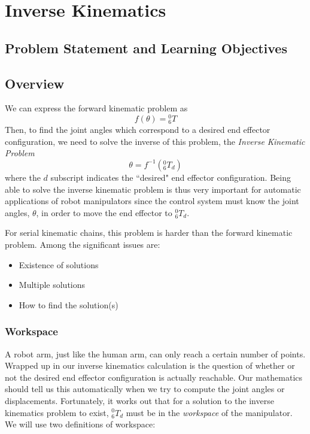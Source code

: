 %

\chapter{Inverse Kinematics}



\section{Problem Statement and Learning Objectives}



\section{Overview}

We can express the forward kinematic problem as
\[
f(\theta) = {^0_6}T
\]
Then, to find the joint angles which correspond to a desired end effector configuration, we need to solve the inverse of this problem, the {\it Inverse Kinematic Problem}
\[
\theta = f^{-1}(^0_6T_d)
\]
where the $d$ subscript indicates the ``desired" end effector configuration.  Being able to solve the inverse kinematic problem is thus very important for automatic applications of robot manipulators since the control system must know the joint angles, $\theta$, in order to move the end effector to $^0_6T_d$.

For serial kinematic chains, this problem is harder than the forward kinematic problem.  Among the significant issues are:
\begin{itemize}
	\item Existence of solutions
	\item Multiple solutions
	\item How to find the solution(s)
\end{itemize}




\subsection{Workspace}
A robot arm, just like the human arm,  can only reach a certain number of points.  Wrapped up in our inverse kinematics calculation is the question of whether or not the desired end effector configuration is actually reachable.  Our mathematics should tell us this automatically when we try to compute the joint angles or displacements.  Fortunately, it works out that for a solution to the inverse kinematics problem to exist,  $^0_6T_d$ must be in the {\it workspace } of the manipulator.  We will use two definitions of workspace:

